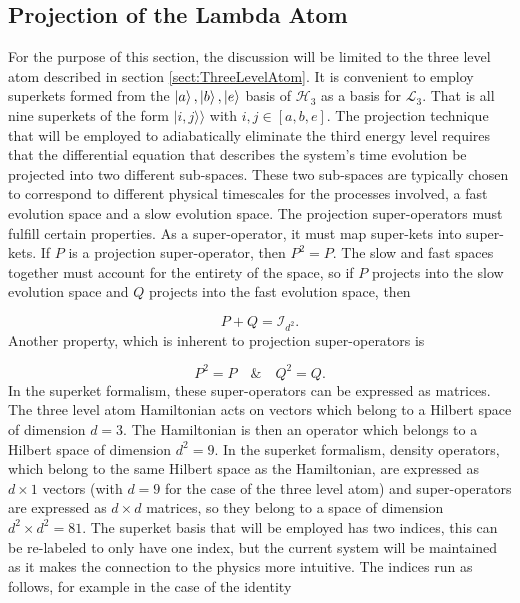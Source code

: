 \documentclass[12pt]{article}
\newcommand{\superket}[1]{|#1\rangle\rangle}
\begin{document}
\subsection{Projection of the Lambda Atom}

For the purpose of this section, the discussion will be limited to the three level atom described in section \ref{sect:ThreeLevelAtom}. It is convenient to employ superkets formed from the $\ket{a},\ket{b},\ket{e}$ basis of $\mathcal{H}_3$ as a basis for $\mathcal{L}_3$. That is all nine superkets of the form $\superket{i,j}$ with $i, j \in [a,b,e]$. The projection technique that will be employed to adiabatically eliminate the third energy level requires that the differential equation that describes the system's time evolution be projected into two different sub-spaces. These two sub-spaces are typically chosen to correspond to different physical timescales for the processes involved, a fast evolution space and a slow evolution space. The projection super-operators must fulfill certain properties. As a super-operator, it must map super-kets into super-kets. If $P$ is a projection super-operator, then $P^2 = P$. The slow and fast spaces together must account for the entirety of the space, so if $P$ projects into the slow evolution space and $Q$ projects into the fast evolution space, then

\begin{equation}\label{eq:ProyectorPropertyIdentity}
    P+Q = \mathcal{I}_{d^2}.
\end{equation} Another property, which is inherent to projection super-operators is

\begin{equation}
    P^2 = P \quad \& \quad Q^2 = Q.
\end{equation} In the superket formalism, these super-operators can be expressed as matrices. The three level atom Hamiltonian acts on vectors which belong to a Hilbert space of dimension $d = 3$. The Hamiltonian is then an operator which belongs to a Hilbert space of dimension $d^2 = 9$. In the superket formalism, density operators, which belong to the same Hilbert space as the Hamiltonian, are expressed as $d \times 1$ vectors (with $d=9$ for the case of the three level atom) and super-operators are expressed as $d \times d$ matrices, so they belong to a space of dimension $d^2 \times d^2 = 81$. The superket basis that will be employed has two indices, this can be re-labeled to only have one index, but the current system will be maintained as it makes the connection to the physics more intuitive. The indices run as follows, for example in the case of the identity
\end{document}
